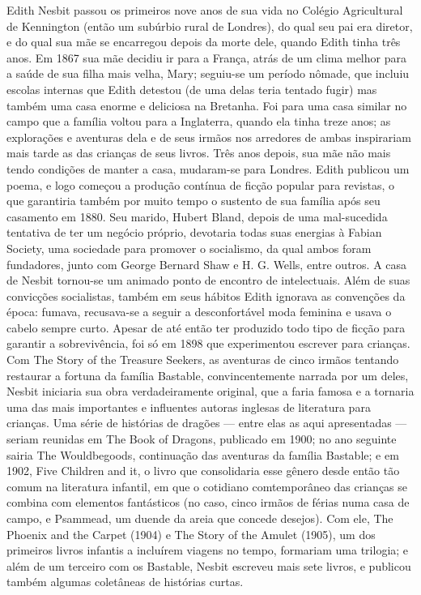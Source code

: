 Edith Nesbit passou os primeiros nove anos de sua vida no Colégio
Agricultural de Kennington (então um subúrbio rural de Londres), do
qual seu pai era diretor, e do qual sua mãe se encarregou depois da
morte dele, quando Edith tinha três anos. Em 1867 sua mãe decidiu ir
para a França, atrás de um clima melhor para a saúde de sua filha
mais velha, Mary; seguiu-se um período nômade, que incluiu escolas
internas que Edith detestou (de uma delas teria tentado fugir) mas
também uma casa enorme e deliciosa na Bretanha. Foi para uma casa
similar no campo que a família voltou para a Inglaterra, quando ela
tinha treze anos; as explorações e aventuras dela e de seus irmãos
nos arredores de ambas inspirariam mais tarde as das crianças de seus
livros. Três anos depois, sua mãe não mais tendo condições de manter
a casa, mudaram-se para Londres. Edith publicou um poema, e logo
começou a produção contínua de ficção popular para revistas, o que
garantiria também por muito tempo o sustento de sua família após seu
casamento em 1880. Seu marido, Hubert Bland, depois de uma
mal-sucedida tentativa de ter um negócio próprio, devotaria todas
suas energias à Fabian Society, uma sociedade para promover o
socialismo, da qual ambos foram fundadores, junto com George Bernard
Shaw e H. G. Wells, entre outros. A casa de Nesbit tornou-se um
animado ponto de encontro de intelectuais. Além de suas convicções
socialistas, também em seus hábitos Edith ignorava as convenções da
época: fumava, recusava-se a seguir a desconfortável moda feminina e
usava o cabelo sempre curto. Apesar de até então ter produzido todo
tipo de ficção para garantir a sobrevivência, foi só em 1898 que
experimentou escrever para crianças. Com The Story of the Treasure
Seekers, as aventuras de cinco irmãos tentando restaurar a fortuna da
família Bastable, convincentemente narrada por um deles, Nesbit
iniciaria sua obra verdadeiramente original, que a faria famosa e a
tornaria uma das mais importantes e influentes autoras inglesas de
literatura para crianças. Uma série de histórias de dragões — entre
elas as aqui apresentadas —  seriam reunidas em The Book of Dragons,
publicado em 1900; no ano seguinte sairia The Wouldbegoods,
continuação das aventuras da família Bastable; e em 1902, Five
Children and it, o livro que consolidaria esse gênero desde então tão
comum na literatura infantil, em que o cotidiano comtemporâneo das
crianças se combina com elementos fantásticos (no caso, cinco irmãos
de férias numa casa de campo, e Psammead, um duende da areia que
concede desejos). Com ele, The Phoenix and the Carpet (1904) e The
Story of the Amulet (1905), um dos primeiros livros infantis a
incluírem viagens no tempo, formariam uma trilogia; e além de um
terceiro com os Bastable, Nesbit escreveu mais sete livros, e
publicou também algumas coletâneas de histórias curtas. 


